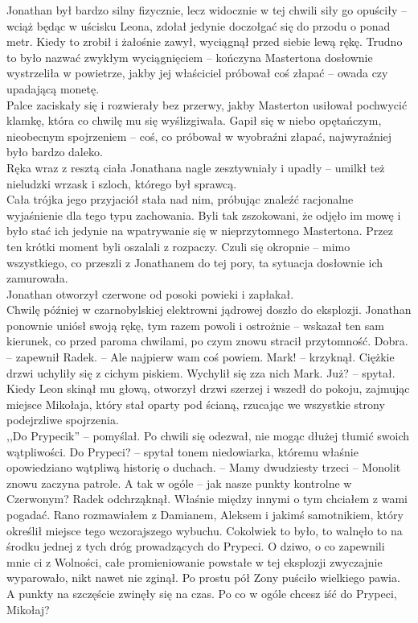 \documentclass[../MAIN.tex]{subfiles}
\begin{document}
Jonathan był bardzo silny fizycznie, lecz widocznie w tej chwili siły go opuściły -- wciąż będąc w uścisku Leona, zdołał jedynie doczołgać się do przodu o ponad metr. Kiedy to zrobił i żałośnie zawył, wyciągnął przed siebie lewą rękę. Trudno to było nazwać zwykłym wyciągnięciem -- kończyna Mastertona dosłownie wystrzeliła w powietrze, jakby jej właściciel próbował coś złapać -- owada czy upadającą monetę.\\
Palce zaciskały się i rozwierały bez przerwy, jakby Masterton usiłował pochwycić klamkę, która co chwilę mu się wyślizgiwała. Gapił się w niebo opętańczym, nieobecnym spojrzeniem -- coś, co próbował w wyobraźni złapać, najwyraźniej było bardzo daleko.
\\
Ręka wraz z resztą ciała Jonathana nagle zesztywniały i upadły -- umilkł też nieludzki wrzask i szloch, którego był sprawcą.
\\
Cała trójka jego przyjaciół stała nad nim, próbując znaleźć racjonalne wyjaśnienie dla tego typu zachowania. Byli tak zszokowani, że odjęło im mowę i było stać ich jedynie na wpatrywanie się w nieprzytomnego Mastertona. Przez ten krótki moment byli oszalali z rozpaczy. Czuli się okropnie -- mimo wszystkiego, co przeszli z Jonathanem do tej pory, ta sytuacja dosłownie ich zamurowała.
\\
Jonathan otworzył czerwone od posoki powieki i zapłakał.\\
Chwilę później w czarnobylskiej elektrowni jądrowej doszło do eksplozji.
Jonathan ponownie uniósł swoją rękę, tym razem powoli i ostrożnie -- wskazał ten sam kierunek, co przed paroma chwilami, po czym znowu stracił przytomność.
% 
% 
\sx Dobra. -- zapewnił Radek. -- Ale najpierw wam coś powiem. Mark! -- krzyknął.
Ciężkie drzwi uchyliły się z cichym piskiem. Wychylił się zza nich Mark.
\xx Już? -- spytał. 
\qd
Kiedy Leon skinął mu głową, otworzył drzwi szerzej i wszedł do pokoju, zajmując miejsce Mikołaja, który stał oparty pod ścianą, rzucając we wszystkie strony podejrzliwe spojrzenia.
\\
,,Do Prypeci\3k'' -- pomyślał. Po chwili się odezwał, nie mogąc dłużej tłumić swoich wątpliwości.
\sx Do Prypeci? -- spytał tonem niedowiarka, któremu właśnie opowiedziano wątpliwą historię o duchach. -- Mamy dwudziesty trzeci -- Monolit znowu zaczyna patrole. A tak w ogóle -- jak nasze punkty kontrolne w Czerwonym?
\qd
Radek odchrząknął.
\sx Właśnie między innymi o tym chciałem z wami pogadać. Rano rozmawiałem z Damianem, Aleksem i jakimś samotnikiem, który określił miejsce tego wczorajszego wybuchu. Cokolwiek to było, to walnęło to na środku jednej z tych dróg prowadzących do Prypeci. O dziwo, o co zapewnili mnie ci z Wolności, całe promieniowanie powstałe w tej eksplozji zwyczajnie wyparowało, nikt nawet nie zginął. Po prostu pół Zony puściło wielkiego pawia. A punkty na szczęście zwinęły się na czas. Po co w ogóle chcesz iść do Prypeci, Mikołaj?
\end{document}
